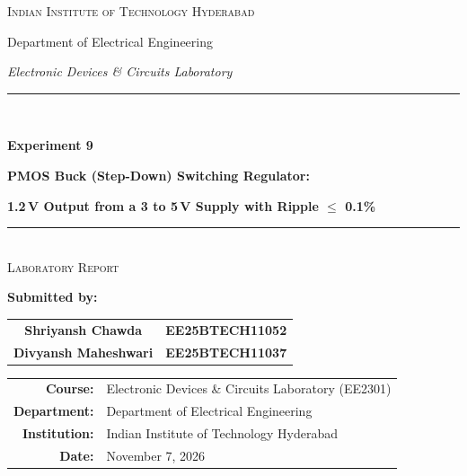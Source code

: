 \documentclass[12pt,a4paper]{article}
\begin{document}
\begin{titlepage}
    \centering
    \vspace*{1.2cm}
    {\large\scshape Indian Institute of Technology Hyderabad\par}
    \vspace{0.2cm}
    {\normalsize Department of Electrical Engineering\par}
    \vspace{0.2cm}
    {\large\itshape Electronic Devices \& Circuits Laboratory\par}
    \vspace{1.5cm}
    
    \rule{\linewidth}{1.0pt}\\[0.4cm]
    {\LARGE\bfseries\color{iitblue} Experiment 9\par}
    \vspace{0.3cm}
    {\Large\bfseries PMOS Buck (Step-Down) Switching Regulator:\par}
    \vspace{0.2cm}
    {\large\bfseries 1.2\,V Output from a 3 to 5\,V Supply with Ripple $\le$ 0.1\%\par}
    \rule{\linewidth}{1.0pt}\\[1.8cm]
    
    \textsc{\Large Laboratory Report}\\[1.5cm]
    
    \begin{minipage}{0.85\textwidth}
        \centering
        \large
        \textbf{Submitted by:}\\[0.4cm]
        \begin{tabular}{cc}
            \textbf{Shriyansh Chawda} & \textbf{EE25BTECH11052} \\[0.2cm]
            \textbf{Divyansh Maheshwari} & \textbf{EE25BTECH11037}
        \end{tabular}
    \end{minipage}
    
    \vfill
    
    \begin{tabular}{rl}
        \textbf{Course:}       & Electronic Devices \& Circuits Laboratory (EE2301) \\
        \textbf{Department:}   & Department of Electrical Engineering \\
        \textbf{Institution:}  & Indian Institute of Technology Hyderabad \\
        \textbf{Date:}         & November 7, 2026
    \end{tabular}
    \vspace*{0.8cm}
\end{titlepage}
\end{document}
